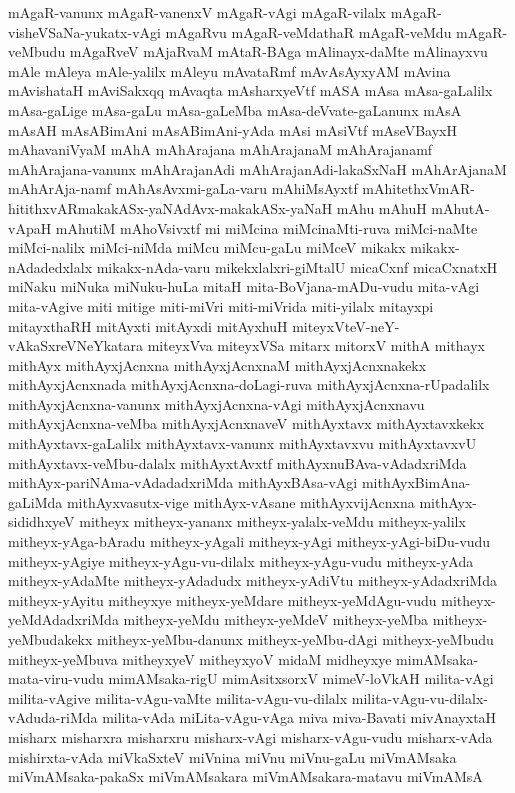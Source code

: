 {mAgaR-vanunx
mAgaR-vanenxV
mAgaR-vAgi
mAgaR-vilalx
mAgaR-visheVSaNa-yukatx-vAgi
mAgaRvu
mAgaR-veMdathaR
mAgaR-veMdu
mAgaR-veMbudu
mAgaRveV
mAjaRvaM
mAtaR-BAga
mAlinayx-daMte
mAlinayxvu
mAle
mAleya
mAle-yalilx
mAleyu
mAvataRmf
mAvAsAyxyAM
mAvina
mAvishataH
mAviSakxqq
mAvaqta
mAsharxyeVtf
mASA
mAsa
mAsa-gaLalilx
mAsa-gaLige
mAsa-gaLu
mAsa-gaLeMba
mAsa-deVvate-gaLanunx
mAsA
mAsAH
mAsABimAni
mAsABimAni-yAda
mAsi
mAsiVtf
mAseVBayxH
mAhavaniVyaM
mAhA
mAhArajana
mAhArajanaM
mAhArajanamf
mAhArajana-vanunx
mAhArajanAdi
mAhArajanAdi-lakaSxNaH
mAhArAjanaM
mAhArAja-namf
mAhAsAvxmi-gaLa-varu
mAhiMsAyxtf
mAhitethxVmAR-hitithxvARmakakASx-yaNAdAvx-makakASx-yaNaH
mAhu
mAhuH
mAhutA-vApaH
mAhutiM
mAhoVsivxtf
mi
miMcina
miMcinaMti-ruva
miMci-naMte
miMci-nalilx
miMci-niMda
miMcu
miMcu-gaLu
miMceV
mikakx
mikakx-nAdadedxlalx
mikakx-nAda-varu
mikekxlalxri-giMtalU
micaCxnf
micaCxnatxH
miNaku
miNuka
miNuku-huLa
mitaH
mita-BoVjana-mADu-vudu
mita-vAgi
mita-vAgive
miti
mitige
miti-miVri
miti-miVrida
miti-yilalx
mitayxpi
mitayxthaRH
mitAyxti
mitAyxdi
mitAyxhuH
miteyxVteV-neY-vAkaSxreVNeYkatara
miteyxVva
miteyxVSa
mitarx
mitorxV
mithA
mithayx
mithAyx
mithAyxjAcnxna
mithAyxjAcnxnaM
mithAyxjAcnxnakekx
mithAyxjAcnxnada
mithAyxjAcnxna-doLagi-ruva
mithAyxjAcnxna-rUpadalilx
mithAyxjAcnxna-vanunx
mithAyxjAcnxna-vAgi
mithAyxjAcnxnavu
mithAyxjAcnxna-veMba
mithAyxjAcnxnaveV
mithAyxtavx
mithAyxtavxkekx
mithAyxtavx-gaLalilx
mithAyxtavx-vanunx
mithAyxtavxvu
mithAyxtavxvU
mithAyxtavx-veMbu-dalalx
mithAyxtAvxtf
mithAyxnuBAva-vAdadxriMda
mithAyx-pariNAma-vAdadadxriMda
mithAyxBAsa-vAgi
mithAyxBimAna-gaLiMda
mithAyxvasutx-vige
mithAyx-vAsane
mithAyxvijAcnxna
mithAyx-sididhxyeV
mitheyx
mitheyx-yananx
mitheyx-yalalx-veMdu
mitheyx-yalilx
mitheyx-yAga-bAradu
mitheyx-yAgali
mitheyx-yAgi
mitheyx-yAgi-biDu-vudu
mitheyx-yAgiye
mitheyx-yAgu-vu-dilalx
mitheyx-yAgu-vudu
mitheyx-yAda
mitheyx-yAdaMte
mitheyx-yAdadudx
mitheyx-yAdiVtu
mitheyx-yAdadxriMda
mitheyx-yAyitu
mitheyxye
mitheyx-yeMdare
mitheyx-yeMdAgu-vudu
mitheyx-yeMdAdadxriMda
mitheyx-yeMdu
mitheyx-yeMdeV
mitheyx-yeMba
mitheyx-yeMbudakekx
mitheyx-yeMbu-danunx
mitheyx-yeMbu-dAgi
mitheyx-yeMbudu
mitheyx-yeMbuva
mitheyxyeV
mitheyxyoV
midaM
midheyxye
mimAMsaka-mata-viru-vudu
mimAMsaka-rigU
mimAsitxsorxV
mimeV-loVkAH
milita-vAgi
milita-vAgive
milita-vAgu-vaMte
milita-vAgu-vu-dilalx
milita-vAgu-vu-dilalx-vAduda-riMda
milita-vAda
miLita-vAgu-vAga
miva
miva-Bavati
mivAnayxtaH
misharx
misharxra
misharxru
misharx-vAgi
misharx-vAgu-vudu
misharx-vAda
mishirxta-vAda
miVkaSxteV
miVnina
miVnu
miVnu-gaLu
miVmAMsaka
miVmAMsaka-pakaSx
miVmAMsakara
miVmAMsakara-matavu
miVmAMsA
}
